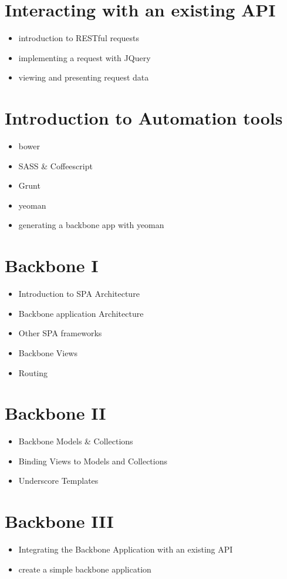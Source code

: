 \documentclass{article}
\begin{document}
\section{Interacting with an existing API}
	\begin{itemize}
		\item introduction to RESTful requests
		\item implementing a request with JQuery 
		\item viewing and presenting request data
	\end{itemize}

\section{Introduction to Automation tools}
	\begin{itemize}
		\item bower
		\item SASS \& Coffeescript
		\item Grunt
		\item yeoman
		\item generating a backbone app with yeoman
	\end{itemize}

\section{Backbone I}
	\begin{itemize}
		\item Introduction to SPA Architecture
		\item Backbone application Architecture
		\item Other SPA frameworks
		\item Backbone Views
		\item Routing
	\end{itemize}

\section{Backbone II}
	\begin{itemize}
		\item Backbone Models \& Collections
		\item Binding Views to Models and Collections
		\item Underscore Templates
	\end{itemize}

\section{Backbone III}
	\begin{itemize}
		\item Integrating the Backbone Application with an existing API
		\item create a simple backbone application 
	\end{itemize}
\end{document}
